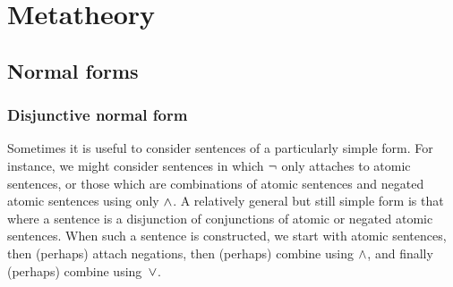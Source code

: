 \part{Metatheory}
\label{ch.normalform}

\chapter{Normal forms}\label{c:NormalForms}


\section{Disjunctive normal form}\label{s:DNFDefined}

Sometimes it is useful to consider sentences of a particularly simple form. For instance, we might consider sentences in which $\neg$ only attaches to atomic sentences, or those which are combinations of atomic sentences and negated atomic sentences using only $\wedge$.  A relatively general but still simple form is that where a sentence is a disjunction of conjunctions of atomic or negated atomic sentences.  When such a sentence is constructed, we start with atomic sentences, then (perhaps) attach negations, then (perhaps) combine using $\wedge$, and finally (perhaps) combine using~$\vee$. 


